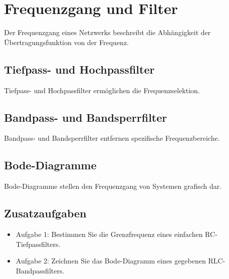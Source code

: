 \documentclass[11pt,a4paper]{article}
\begin{document}

\vspace{1cm}
\section{Frequenzgang und Filter}
Der Frequenzgang eines Netzwerks beschreibt die Abhängigkeit der Übertragungsfunktion von der Frequenz.


\subsection{Tiefpass- und Hochpassfilter}
Tiefpass- und Hochpassfilter ermöglichen die Frequenzselektion.

\subsection{Bandpass- und Bandsperrfilter}
Bandpass- und Bandsperrfilter entfernen spezifische Frequenzbereiche.

\subsection{Bode-Diagramme}
Bode-Diagramme stellen den Frequenzgang von Systemen grafisch dar.

\subsection{Zusatzaufgaben}
\begin{itemize}
	\item Aufgabe 1: Bestimmen Sie die Grenzfrequenz eines einfachen RC-Tiefpassfilters.
	\item Aufgabe 2: Zeichnen Sie das Bode-Diagramm eines gegebenen RLC-Bandpassfilters.
\end{itemize}
\end{document}
